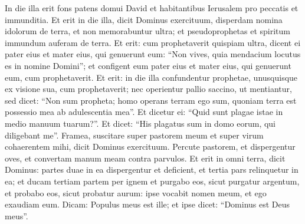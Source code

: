 \begin{biblechapter}
\begin{biblechapter}
\begin{biblechapter}
\begin{biblechapter}
\begin{biblechapter}
\begin{biblechapter}
\begin{biblechapter}
\begin{biblechapter}
\begin{biblechapter}
\begin{biblechapter}
\begin{biblechapter}
\begin{biblechapter}
\begin{biblechapter}
\verse In die illa erit fons patens domui David et habitantibus Ierusalem pro peccatis et immunditia. 
\verse Et erit in die illa, dicit Dominus exercituum, disperdam nomina idolorum de terra, et non memorabuntur ultra; et pseudoprophetas et spiritum immundum auferam de terra. 
\verse Et erit: cum prophetaverit quispiam ultra, dicent ei pater eius et mater eius, qui genuerunt eum: “Non vives, quia mendacium locutus es in nomine Domini”; et configent eum pater eius et mater eius, qui genuerunt eum, cum prophetaverit. 
\verse Et erit: in die illa confundentur prophetae, unusquisque ex visione sua, cum prophetaverit; nec operientur pallio saccino, ut mentiantur, 
\verse sed dicet: “Non sum propheta; homo operans terram ego sum, quoniam terra est possessio mea ab adulescentia mea”. 
\verse Et dicetur ei: “Quid sunt plagae istae in medio manuum tuarum?”. Et dicet: “His plagatus sum in domo eorum, qui diligebant me”.
 \verse Framea, suscitare super pastorem meum
 et super virum cohaerentem mihi,
 dicit Dominus exercituum.
 Percute pastorem, et dispergentur oves,
 et convertam manum meam contra parvulos.
 \verse Et erit in omni terra,
 dicit Dominus:
 partes duae in ea dispergentur et deficient,
 et tertia pars relinquetur in ea;
 \verse et ducam tertiam partem per ignem
 et purgabo eos, sicut purgatur argentum,
 et probabo eos, sicut probatur aurum:
 ipse vocabit nomen meum,
 et ego exaudiam eum.
 Dicam: Populus meus est ille;
 et ipse dicet: “Dominus est Deus meus”.
 

\end{biblechapter}
\end{biblechapter}
\end{biblechapter}
\end{biblechapter}
\end{biblechapter}
\end{biblechapter}
\end{biblechapter}
\end{biblechapter}
\end{biblechapter}
\end{biblechapter}
\end{biblechapter}
\end{biblechapter}
\end{biblechapter}
